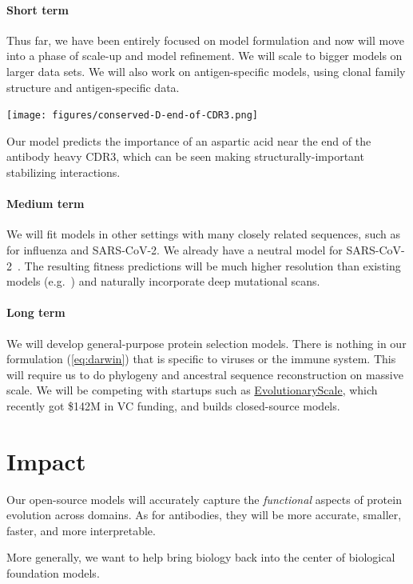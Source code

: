 \documentclass[nobib]{tufte-handout}
\begin{document}
\paragraph{Short term}
Thus far, we have been entirely focused on model formulation and now will move into a phase of scale-up and model refinement. We will scale to bigger models on larger data sets. We will also work on antigen-specific models, using clonal family structure and antigen-specific data.

\begin{marginfigure}[1.3cm]%
  \hspace{-7pt}
  \texttt{[image: figures/conserved-D-end-of-CDR3.png]}
  \caption{Our model predicts the importance of an aspartic acid near the end of the antibody heavy CDR3, which can be seen making structurally-important stabilizing interactions.}
  \label{fig:interpretation}
\end{marginfigure}

\paragraph{Medium term}
We will fit models in other settings with many closely related sequences, such as for influenza and SARS-CoV-2.
We already have a neutral model for SARS-CoV-2~\cite{Haddox2025-ej}.
The resulting fitness predictions will be much higher resolution than existing models (e.g.~\cite{Bloom2023-af}) and naturally incorporate deep mutational scans.

\paragraph{Long term}
We will develop general-purpose protein selection models.
There is nothing in our formulation (\ref{eq:darwin}) that is specific to viruses or the immune system.
This will require us to do phylogeny and ancestral sequence reconstruction on massive scale.
We will be competing with startups such as \href{https://www.evolutionaryscale.ai/}{EvolutionaryScale}, which recently got \$142M in VC funding, and builds closed-source models.

\section{Impact}
Our open-source models will accurately capture the \emph{functional} aspects of protein evolution across domains. 
As for antibodies, they will be more accurate, smaller, faster, and more interpretable.

More generally, we want to help bring biology back into the center of biological foundation models.




\newpage


\end{document}
